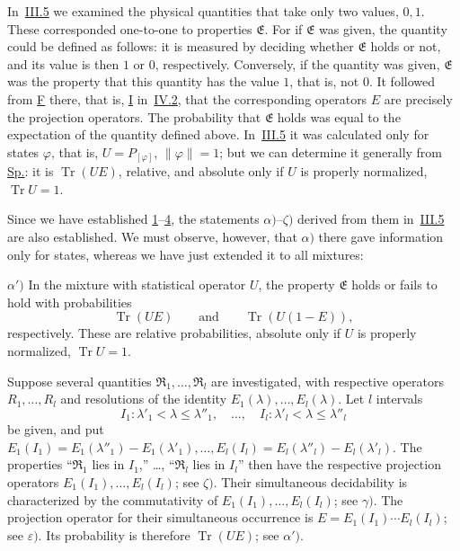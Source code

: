 \documentclass[fontsize=13pt,twoside,openany,headings=normal,parskip=false,bookmarkpackage=false,DIV=calc]{scrbook}
\begin{document}
In~\hyperref[sec:III.5]{III.5} we examined the physical quantities that take only two values, $0,1$. These corresponded one-to-one to properties $\mathfrak E$. For if $\mathfrak E$ was given, the quantity could be defined as follows: it is measured by deciding whether $\mathfrak E$
\hypertarget{origpage-178}{}%
holds or not, and its value is then $1$ or $0$, respectively. Conversely, if the quantity was given, $\mathfrak E$ was the property that this quantity has the value $1$, that is, not $0$. It followed from \hyperref[post:III.5.F]{F} there, that is, \hyperref[cond:IV.2.I]{I} in~\hyperref[sec:IV.2]{IV.2}, that the corresponding operators $E$ are precisely the projection operators. The probability that $\mathfrak E$ holds was equal to the expectation of the quantity defined above. In~\hyperref[sec:III.5]{III.5} it was calculated only for states $\varphi$, that is, $U=P_{[\varphi]}$, $\|\varphi\|=1$; but we can determine it generally from \hyperref[eq:IV.2.Sp]{Sp.}: it is $\operatorname{Tr}(UE)$, relative, and absolute only if $U$ is properly normalized, $\operatorname{Tr}U=1$.

Since we have established \hyperref[criterion:IV.3.1]{1}--\hyperref[criterion:IV.3.4]{4}, the statements \hyperref[post:III.5.alpha]{$\alpha)$}--\hyperref[post:III.5.zeta]{$\zeta)$} derived from them in~\hyperref[sec:III.5]{III.5} are also established. We must observe, however, that \hyperref[post:III.5.alpha]{$\alpha)$} there gave information only for states, whereas we have just extended it to all mixtures:

\noindent{}$\alpha')$\label{prop:IV.3.alphaprime} In the mixture with statistical operator $U$, the property $\mathfrak E$ holds or fails to hold with probabilities
\[
\operatorname{Tr}(UE)\qquad\text{and}\qquad\operatorname{Tr}(U(1-E)),
\]
respectively. These are relative probabilities, absolute only if $U$ is properly normalized, $\operatorname{Tr}U=1$.

Suppose several quantities $\mathfrak R_1,\ldots,\mathfrak R_l$ are investigated, with respective operators $R_1,\ldots,R_l$ and resolutions of the identity $E_1(\lambda),\ldots,E_l(\lambda)$. Let $l$ intervals
\[
I_1:\lambda'_1<\lambda\leq\lambda''_1,\quad\ldots,\quad
I_l:\lambda'_l<\lambda\leq\lambda''_l
\]
be given, and put $E_1(I_1)=E_1(\lambda''_1)-E_1(\lambda'_1),\ldots,E_l(I_l)=E_l(\lambda''_l)-E_l(\lambda'_l)$. The properties ``$\mathfrak R_1$ lies in $I_1$,'' \ldots, ``$\mathfrak R_l$ lies in $I_l$'' then have the respective projection operators $E_1(I_1),\ldots,E_l(I_l)$; see \hyperref[post:III.5.zeta]{$\zeta)$}. Their simultaneous decidability is characterized by the commutativity of $E_1(I_1),\ldots,E_l(I_l)$; see \hyperref[post:III.5.gamma]{$\gamma)$}. The projection operator for their simultaneous occurrence is $E=E_1(I_1)\cdots E_l(I_l)$; see \hyperref[post:III.5.epsilon]{$\varepsilon)$}. Its probability is therefore $\operatorname{Tr}(UE)$; see \hyperref[prop:IV.3.alphaprime]{$\alpha')$}.
\end{document}
